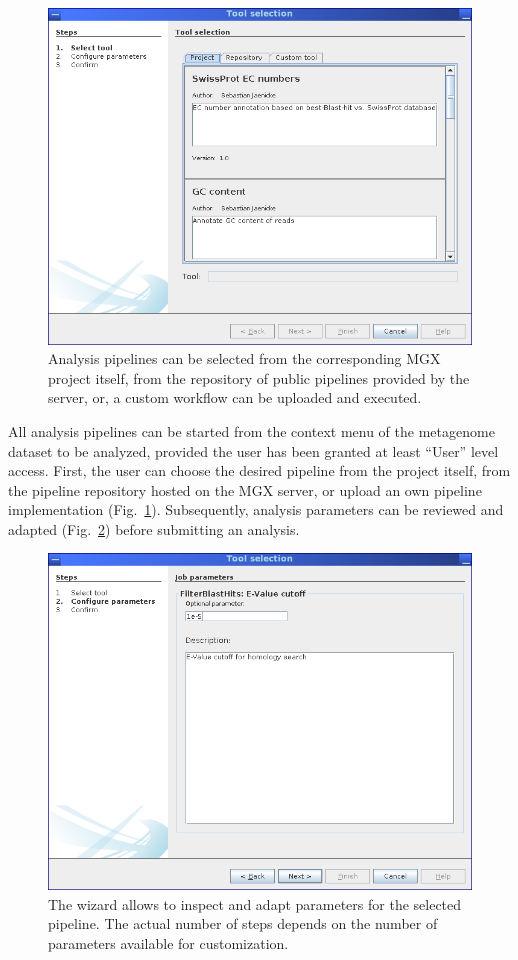 \begin{figure}[H]
\centering
\includegraphics[width=.8\textwidth]{img/mgx/analysiswiz1}
\caption[Analysis selection]{Analysis pipelines can be selected from the corresponding
MGX project itself, from the repository of public pipelines provided by the server, or,
a custom workflow can be uploaded and executed.}
\label{anawiz1}
\end{figure}

All analysis pipelines can be started from the context menu of the metagenome dataset to be analyzed, provided
the user has been granted at least ``User'' level access. First,
the user can choose the desired pipeline from the project itself, from the pipeline repository hosted on the
MGX server, or upload an own pipeline implementation (Fig.~\ref{anawiz1}). Subsequently, analysis parameters
can be reviewed and adapted (Fig.~\ref{anawiz2}) before submitting an analysis.

\begin{figure}[H]
\centering
\includegraphics[width=.8\textwidth]{img/mgx/analysiswiz2}
\caption[Analysis parameters]{The wizard allows to inspect and adapt parameters for the selected pipeline. The actual
number of steps depends on the number of parameters available for customization.}
\label{anawiz2}
\end{figure}

